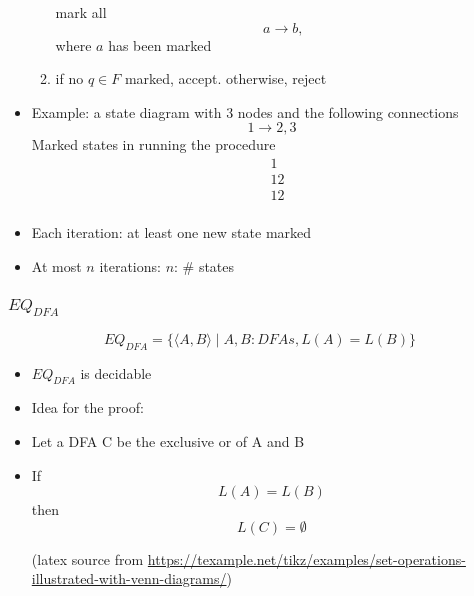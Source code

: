 \begin{frame}[allowframebreaks]
\begin{itemize}
\begin{enumerate}
\qquad mark all 
\begin{equation*}
  a\rightarrow b,
\end{equation*}
\qquad where $a$ has been marked
\item if no $q\in F$ marked, accept.
otherwise, reject
  \end{enumerate}
\item Example: a state diagram with 3 nodes and the following connections
  \begin{equation*}
    1\rightarrow 2, 3
  \end{equation*}
  Marked states in running the procedure
  \begin{equation*}
    \begin{split}
& 1  \\
& 1 2\\
& 1 2\\
\end{split}
\end{equation*}
\item Each iteration: at least one new state marked
\item At most $n$ iterations: $n$: \# states
\end{itemize}\end{frame} \begin{frame}[allowframebreaks] \frametitle{$EQ_{DFA}$}
\begin{equation*}
  EQ_{DFA}
=\{\langle  A,B\rangle \mid A, B: DFAs, 
L(A)=L(B)\}
\end{equation*}
  \begin{itemize}
\item $EQ_{DFA}$ is decidable
\item Idea for the proof:

\item Let a DFA C be the exclusive or of A and B

\item [] If
  \begin{equation*}
  L(A)=L(B)
\end{equation*}
then
\begin{equation*}
  L(C)=\emptyset
\end{equation*}

\begin{center}
\end{center}
{\small (latex source from
\url{https://texample.net/tikz/examples/set-operations-illustrated-with-venn-diagrams/})}


\end{itemize}
\end{frame}
